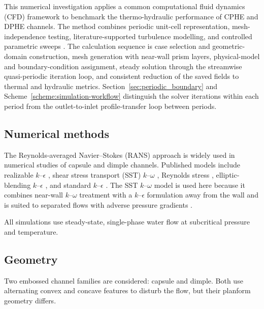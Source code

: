 \documentclass[energies,article,submit,moreauthors,noheaderline]{Definitions/mdpi}
\begin{document}
This numerical investigation applies a common computational fluid dynamics (CFD) framework to benchmark the thermo-hydraulic performance of CPHE and DPHE channels. The method combines periodic unit-cell representation, mesh-independence testing, literature-supported turbulence modelling, and controlled parametric sweeps \citep{jiang2019, mocnik2020}. The calculation sequence is case selection and geometric-domain construction, mesh generation with near-wall prism layers, physical-model and boundary-condition assignment, steady solution through the streamwise quasi-periodic iteration loop, and consistent reduction of the saved fields to thermal and hydraulic metrics. Section~\ref{sec:periodic_boundary} and Scheme~\ref{scheme:simulation-workflow} distinguish the solver iterations within each period from the outlet-to-inlet profile-transfer loop between periods.

\subsection{Numerical methods}
\label{sec:numerical_methods}

The Reynolds-averaged Navier--Stokes (RANS) approach is widely used in numerical studies of capsule and dimple channels. Published models include realizable $k$--$\epsilon$ \citep{kumar2019, jing2019, mocnik2020, mocnik2024}, shear stress transport (SST) $k$--$\omega$ \citep{hamedi2024, jiang2019a, jiang2020, mocnik2020, mocnik2024, torre2019}, Reynolds stress \citep{shao2024, mocnik2023}, elliptic-blending $k$--$\epsilon$ \citep{arsenyeva2019, piper2019}, and standard $k$--$\epsilon$ \citep{soman2022}. The SST $k$--$\omega$ model is used here because it combines near-wall $k$--$\omega$ treatment with a $k$--$\epsilon$ formulation away from the wall and is suited to separated flows with adverse pressure gradients \citep{kanaris2006, khail2023, menter1994}.

All simulations use steady-state, single-phase water flow at subcritical pressure and temperature.



\subsection{Geometry}
\label{sec:geometry}

Two embossed channel families are considered: capsule and dimple. Both use alternating convex and concave features to disturb the flow, but their planform geometry differs.
\end{document}
